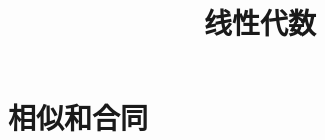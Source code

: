 \documentclass[aspectratio=169]{ctexbeamer}
\title{线性代数}
\begin{document}
\setcounter{part}{2}
\part{相似和合同}



\end{document}
